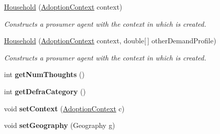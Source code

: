 \begin{DoxyCompactItemize}
\item 
\hyperlink{classuk_1_1ac_1_1dmu_1_1iesd_1_1cascade_1_1agents_1_1prosumers_1_1_household_a96897a52f3e5bfa0afaf2a54975d5997}{Household} (\hyperlink{classuk_1_1ac_1_1dmu_1_1iesd_1_1cascade_1_1context_1_1_adoption_context}{Adoption\-Context} context)
\begin{DoxyCompactList}\small\item\em Constructs a prosumer agent with the context in which is created. \end{DoxyCompactList}\item 
\hyperlink{classuk_1_1ac_1_1dmu_1_1iesd_1_1cascade_1_1agents_1_1prosumers_1_1_household_ac6e52dbada5690a83ea7d79d31a5af20}{Household} (\hyperlink{classuk_1_1ac_1_1dmu_1_1iesd_1_1cascade_1_1context_1_1_adoption_context}{Adoption\-Context} context, double\mbox{[}$\,$\mbox{]} other\-Demand\-Profile)
\begin{DoxyCompactList}\small\item\em Constructs a prosumer agent with the context in which is created. \end{DoxyCompactList}\item 
\hypertarget{classuk_1_1ac_1_1dmu_1_1iesd_1_1cascade_1_1agents_1_1prosumers_1_1_household_ac404b761e7ed227f15e0d23992df6e5b}{int {\bfseries get\-Num\-Thoughts} ()}\label{classuk_1_1ac_1_1dmu_1_1iesd_1_1cascade_1_1agents_1_1prosumers_1_1_household_ac404b761e7ed227f15e0d23992df6e5b}

\item 
\hypertarget{classuk_1_1ac_1_1dmu_1_1iesd_1_1cascade_1_1agents_1_1prosumers_1_1_household_a18c8c778973afb2b0d1ce45f8ed271af}{int {\bfseries get\-Defra\-Category} ()}\label{classuk_1_1ac_1_1dmu_1_1iesd_1_1cascade_1_1agents_1_1prosumers_1_1_household_a18c8c778973afb2b0d1ce45f8ed271af}

\item 
\hypertarget{classuk_1_1ac_1_1dmu_1_1iesd_1_1cascade_1_1agents_1_1prosumers_1_1_household_a11db19b72b5509871498706c5fd06346}{void {\bfseries set\-Context} (\hyperlink{classuk_1_1ac_1_1dmu_1_1iesd_1_1cascade_1_1context_1_1_adoption_context}{Adoption\-Context} c)}\label{classuk_1_1ac_1_1dmu_1_1iesd_1_1cascade_1_1agents_1_1prosumers_1_1_household_a11db19b72b5509871498706c5fd06346}

\item 
\hypertarget{classuk_1_1ac_1_1dmu_1_1iesd_1_1cascade_1_1agents_1_1prosumers_1_1_household_a8e768e294af41a46854565a8d6ab239a}{void {\bfseries set\-Geography} (Geography g)}\label{classuk_1_1ac_1_1dmu_1_1iesd_1_1cascade_1_1agents_1_1prosumers_1_1_household_a8e768e294af41a46854565a8d6ab239a}


\end{DoxyCompactItemize}
